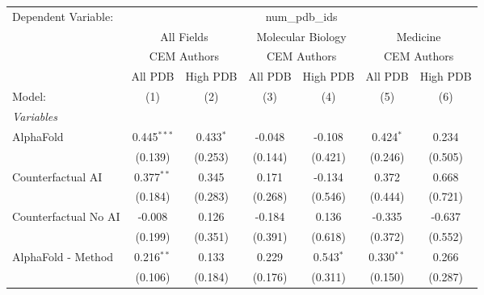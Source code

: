 \begingroup
\centering
\begin{tabular}{lcccccc}
   \tabularnewline \midrule \midrule
   Dependent Variable: & \multicolumn{6}{c}{num\_pdb\_ids}\\
 & \multicolumn{2}{c}{All Fields} & \multicolumn{2}{c}{Molecular Biology} & \multicolumn{2}{c}{Medicine} \\
\cmidrule(lr){2-3} \cmidrule(lr){4-5} \cmidrule(lr){6-7}
 & \multicolumn{2}{c}{CEM Authors} & \multicolumn{2}{c}{CEM Authors} & \multicolumn{2}{c}{CEM Authors} \\
\cmidrule(lr){2-3} \cmidrule(lr){4-5} \cmidrule(lr){6-7}
 & \multicolumn{1}{c}{All PDB} & \multicolumn{1}{c}{High PDB} & \multicolumn{1}{c}{All PDB} & \multicolumn{1}{c}{High PDB} & \multicolumn{1}{c}{All PDB} & \multicolumn{1}{c}{High PDB} \\
\cmidrule(lr){2-2} \cmidrule(lr){3-3} \cmidrule(lr){4-4} \cmidrule(lr){5-5} \cmidrule(lr){6-6} \cmidrule(lr){7-7}
   Model:                                                     & (1)            & (2)          & (3)          & (4)         & (5)           & (6)\\  
   \midrule
   \emph{Variables}\\
   AlphaFold                                                  & 0.445$^{***}$  & 0.433$^{*}$  & -0.048       & -0.108      & 0.424$^{*}$   & 0.234\\   
                                                              & (0.139)        & (0.253)      & (0.144)      & (0.421)     & (0.246)       & (0.505)\\   
   Counterfactual AI                                          & 0.377$^{**}$   & 0.345        & 0.171        & -0.134      & 0.372         & 0.668\\   
                                                              & (0.184)        & (0.283)      & (0.268)      & (0.546)     & (0.444)       & (0.721)\\   
   Counterfactual No AI                                       & -0.008         & 0.126        & -0.184       & 0.136       & -0.335        & -0.637\\   
                                                              & (0.199)        & (0.351)      & (0.391)      & (0.618)     & (0.372)       & (0.552)\\   
   AlphaFold - Method                                         & 0.216$^{**}$   & 0.133        & 0.229        & 0.543$^{*}$ & 0.330$^{**}$  & 0.266\\   
                                                              & (0.106)        & (0.184)      & (0.176)      & (0.311)     & (0.150)       & (0.287)\\   

\end{tabular}
